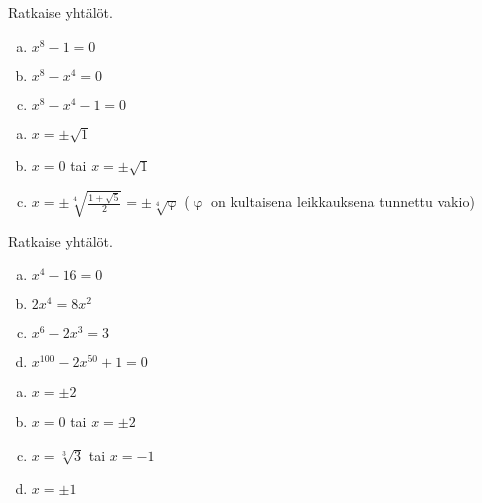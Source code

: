 \begin{tehtava}
    Ratkaise yhtälöt.
    \begin{enumerate}[a)]
        \item $x^8 - 1 = 0$
        \item $x^8 - x^4 = 0$
        \item $x^8 - x^4 - 1 = 0$
    \end{enumerate}
    \begin{vastaus}
        \begin{enumerate}[a)]
            \item $x = \pm\sqrt{1}$
            \item $x = 0$ tai $x = \pm\sqrt{1}$
            \item $x = \pm\sqrt[4]{\frac{1+\sqrt{5}}{2}} = \pm\sqrt[4]{\upvarphi}$ ($\upvarphi$ on kultaisena leikkauksena tunnettu vakio)
        \end{enumerate}
    \end{vastaus}
\end{tehtava}

\begin{tehtava}
    Ratkaise yhtälöt.
    \begin{enumerate}[a)]
        \item $x^4 - 16 = 0$
        \item $2x^4 = 8x^2$
        \item $x^6 - 2x^3 = 3$
        \item $x^{100} - 2x^{50} + 1 = 0$
    \end{enumerate}
    \begin{vastaus}
        \begin{enumerate}[a)]
            \item $x = \pm2$
            \item $x = 0$ tai $x=\pm2$
            \item $x = \sqrt[3]{3}$ tai $x= -1$
            \item $x = \pm1$
        \end{enumerate}
    \end{vastaus}
\end{tehtava}

